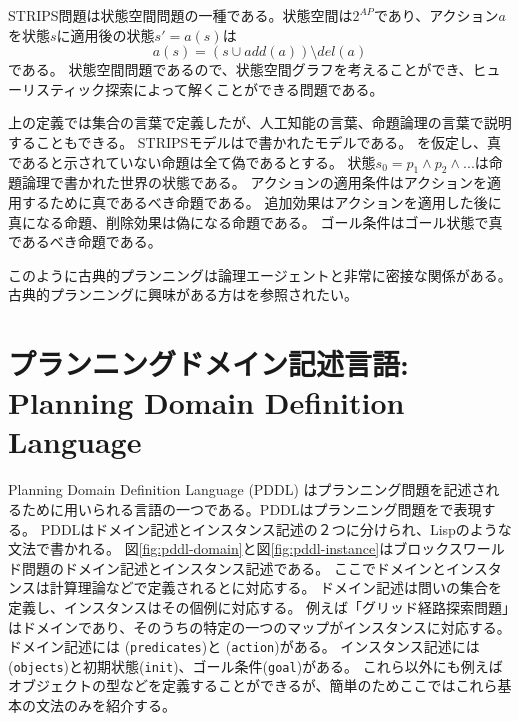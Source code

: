 STRIPS問題は状態空間問題の一種である。状態空間は$2^{AP}$であり、アクション$a$を状態$s$に適用後の状態$s' = a(s)$は
\begin{equation}
	a(s) = (s \cup add(a)) \setminus del(a)
\end{equation}
である。
状態空間問題であるので、状態空間グラフを考えることができ、ヒューリスティック探索によって解くことができる問題である。

上の定義では集合の言葉で定義したが、人工知能の言葉、命題論理の言葉で説明することもできる。
STRIPSモデルはで書かれたモデルである。
を仮定し、真であると示されていない命題は全て偽であるとする。
状態$s_0 = p_1 \land p_2 \land ...$は命題論理で書かれた世界の状態である。
アクションの適用条件はアクションを適用するために真であるべき命題である。
追加効果はアクションを適用した後に真になる命題、削除効果は偽になる命題である。
ゴール条件はゴール状態で真であるべき命題である。

このように古典的プランニングは論理エージェントと非常に密接な関係がある。
古典的プランニングに興味がある方は\cite{russelln03}を参照されたい。


\section{プランニングドメイン記述言語:　Planning Domain Definition Language}
\label{sec:pddl}

Planning Domain Definition Language (PDDL) \cite{aeronautiques1998pddl}はプランニング問題を記述されるために用いられる言語の一つである。PDDLはプランニング問題をで表現する。
PDDLはドメイン記述とインスタンス記述の２つに分けられ、Lispのような文法で書かれる。
図\ref{fig:pddl-domain}と図\ref{fig:pddl-instance}はブロックスワールド問題のドメイン記述とインスタンス記述である。
ここでドメインとインスタンスは計算理論などで定義されるとに対応する。
ドメイン記述は問いの集合を定義し、インスタンスはその個例に対応する。
例えば「グリッド経路探索問題」はドメインであり、そのうちの特定の一つのマップがインスタンスに対応する。
ドメイン記述には (\texttt{predicates})と (\texttt{action})がある。
インスタンス記述には (\texttt{objects})と初期状態(\texttt{init})、ゴール条件(\texttt{goal})がある。
これら以外にも例えばオブジェクトの型などを定義することができるが、簡単のためここではこれら基本の文法のみを紹介する。

